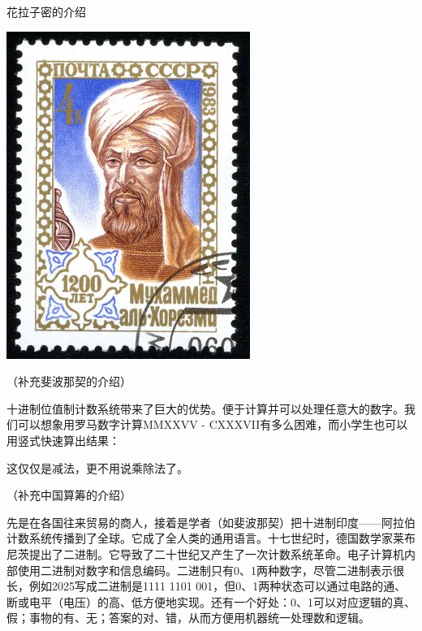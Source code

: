 \documentclass[b5paper]{ctexart}
\begin{document}
\begin{mdframed}
花拉子密的介绍

\begin{center}
 \includegraphics[scale=0.35]{img/Khwarizmi}
 \label{fig:hindu-arabic-numerals}
\end{center}

（补充斐波那契的介绍）

\end{mdframed}

十进制位值制计数系统带来了巨大的优势。便于计算并可以处理任意大的数字。我们可以想象用罗马数字计算MMXXVV - CXXXVII有多么困难，而小学生也可以用竖式快速算出结果：

\begin{center}
\end{center}

这仅仅是减法，更不用说乘除法了。

（补充中国算筹的介绍）

先是在各国往来贸易的商人，接着是学者（如斐波那契）把十进制印度——阿拉伯计数系统传播到了全球。它成了全人类的通用语言。十七世纪时，德国数学家莱布尼茨提出了二进制。它导致了二十世纪又产生了一次计数系统革命。电子计算机内部使用二进制对数字和信息编码。二进制只有0、1两种数字，尽管二进制表示很长，例如2025写成二进制是1111 1101 001，但0、1两种状态可以通过电路的通、断或电平（电压）的高、低方便地实现。还有一个好处：0、1可以对应逻辑的真、假；事物的有、无；答案的对、错，从而方便用机器统一处理数和逻辑。
\end{document}
